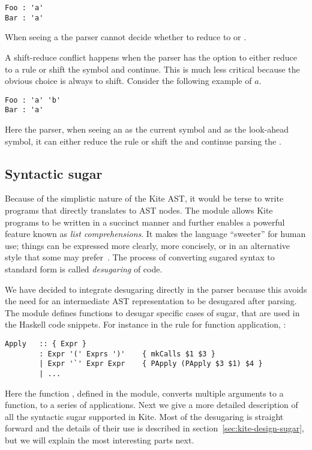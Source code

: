 \begin{lstlisting}
Foo : 'a'
Bar : 'a'
\end{lstlisting}

When seeing a  the parser cannot decide whether to reduce to  or .

A shift-reduce conflict happens when the parser has the option to either reduce to a rule or shift the symbol and continue. This is much less critical because the obvious choice is always to shift. Consider the following example of $a$.

\begin{lstlisting}
Foo : 'a' 'b'
Bar : 'a'
\end{lstlisting}

Here the parser, when seeing an  as the current symbol and  as the look-ahead symbol, it can either reduce the  rule or shift the  and continue parsing the .


\subsection{Syntactic sugar}
\label{sec:imp-sugar}
Because of the simplistic nature of the Kite AST, it would be terse to write programs that directly translates to AST nodes. The  module allows Kite programs to be written in a succinct manner and further enables a powerful feature known as \emph{list comprehensions}. It makes the language ``sweeter'' for human use; things can be expressed more clearly, more concisely, or in an alternative style that some may prefer~\cite{wiki-sugar14}. The process of converting sugared syntax to standard form is called \emph{desugaring} of code.

We have decided to integrate desugaring directly in the parser because this avoids the need for an intermediate AST representation to be desugared after parsing. The  module defines functions to desugar specific cases of sugar, that are used in the Haskell code snippets. For instance in the rule for function application, :

\begin{lstlisting}
Apply   :: { Expr }
        : Expr '(' Exprs ')'    { mkCalls $1 $3 }
        | Expr '`' Expr Expr    { PApply (PApply $3 $1) $4 }
        | ...
\end{lstlisting}

Here the function , defined in the  module, converts multiple arguments to a function, to a series of applications. Next we give a more detailed description of all the syntactic sugar supported in Kite. Most of the desugaring is straight forward and the details of their use is described in section~\ref{sec:kite-design-sugar}, but we will explain the most interesting parts next.

